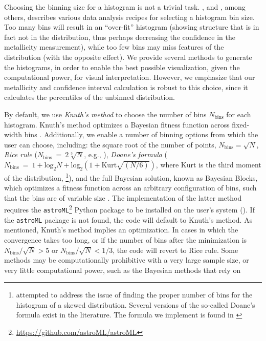 \documentclass{emulateapj}
\begin{document}
Choosing the binning size for a histogram is not a trivial task.
\citet{hogg08}, and \citet{astroMLText}, among others, describes
various data analysis recipes for selecting a histogram bin size. Too
many bins will result in an ``over-fit'' histogram (showing structure
that is in fact not in the distribution, thus perhaps decreasing the
confidence in the metallicity measurement), while too few bins may
miss features of the distribution (with the opposite effect).  We
provide several methods to generate the histograms, in order to
enable the best possible visualization, given the computational power,
for visual interpretation. However, we emphasize that our metallicity
and confidence interval calculation is robust to this choice, since it
calculates the percentiles of the unbinned distribution.

By default, we use \emph{Knuth's method} to choose the number of bins
$N_\mathrm{bins}$ for each histogram. Knuth's method optimizes a
Bayesian fitness function across fixed-width bins
\citep{knuth06}. Additionally, we enable a number of binning options
from which the user can choose, including: the square root of the
number of points, $N_\mathrm{bins}=\sqrt{N}$, \emph{Rice rule}
($N_\mathrm{bins}~=~2\sqrt[3]{N}$, e.g., \citealt{hastie09}),
\emph{Doane's formula} ($N_\mathrm{bins}~=~1 + \mathrm{log}_2{N} +
\mathrm{log}_2\left(1 + \mathrm{Kurt}\sqrt{(N / 6)}\right)$, where
Kurt is the third moment of the distribution,
\citealt{doane76}\footnote{\citet{doane76} attempted to address the
  issue of finding the proper number of bins for the histogram of a
  skewed distribution. Several versions of the so-called Doane's
  formula exist in the literature. The formula we implement is found
  in \citealt{bonate11}}), and the full Bayesian solution, known as
Bayesian Blocks, which optimizes a fitness function across an
arbitrary configuration of bins, such that the bins are of variable
size \citep{scargle13}. The implementation of the latter method
requires the
\verb=astroML=\footnote{\url{https://github.com/astroML/astroML}}
Python package to be installed on the user's system
(\citealt{astroml}). If the \verb=astroML= package is not found, the
code will default to Knuth's method.  As mentioned, Knuth's method
implies an optimization. In cases in which the convergence takes too
long, or if the number of bins after the minimization is
$N_\mathrm{bins}/\sqrt{N} > 5$ or $N_\mathrm{bins}/\sqrt{N} < 1/3$,
the code will revert to Rice rule.  Some methods may be
computationally prohibitive with a very large sample size, or very
little computational power, such as the Bayesian methods that rely on
\end{document}
